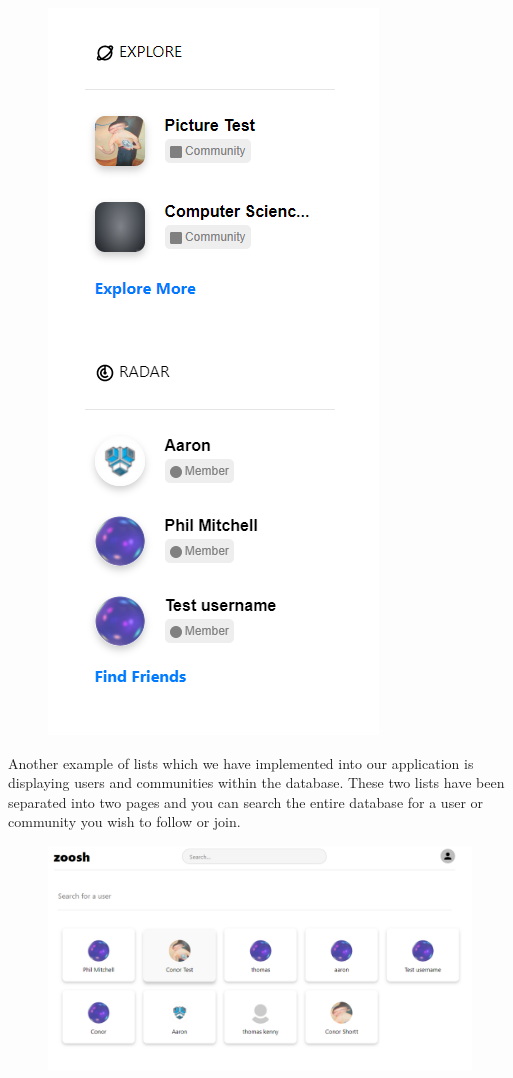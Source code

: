 \begin{figure}[H]
  \centering
  \includegraphics[scale=0.55]{img/recommended.PNG}
  \label{fig:Recommended Users and Communities Lists}
\end{figure}

\newline
Another example of lists which we have implemented into our application is displaying users and communities within the database. These two lists have been separated into two pages and you can search the entire database for a user or community you wish to follow or join.

\begin{figure}[H]
  \centering
  \includegraphics[scale=0.25]{img/users.png}
  \label{fig:Search Users within the website.}
\end{figure}

